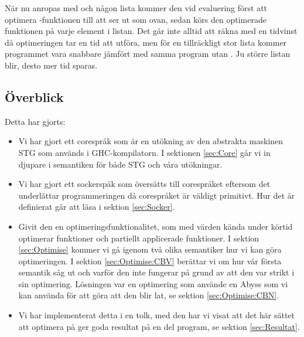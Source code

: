 \documentclass[Rapport]{subfiles}
\begin{document}
När nu  anropas med  och någon lista  kommer
den vid evaluering först att optimera -funktionen till att 
ser ut som  ovan, sedan körs den optimerade funktionen på varje
element i listan. Det går inte alltid att räkna med en tidvinst då optimeringen tar en  tid att utföra,
men för en tillräckligt stor lista 
 kommer programmet vara snabbare jämfört med samma program utan .
Ju större listan  blir, desto mer tid sparas.



\subsection{Överblick}

Detta har gjorts:

\begin{itemize}
    \item Vi har gjort ett corespråk som är en utökning av den abstrakta maskinen STG \cite{stg} som används i 
          GHC-kompilatorn. I sektionen \ref{sec:Core} går vi in djupare i semantiken för både STG och våra utökningar. 
    \item Vi har gjort ett sockerspåk som översätts till corespråket eftersom det underlättar 
          programmeringen då corespråket är väldigt primitivt. Hur det är definierat
          går att läsa i sektion \ref{sec:Socker}.
    \item Givit den en optimeringsfunktionalitet, som med värden kända under körtid
          optimerar funktioner och partiellt applicerade funktioner. I sektion \ref{sec:Optimise}
          kommer vi gå igenom två olika semantiker hur vi kan göra optimeringen.
          I sektion \ref{sec:Optimise:CBV} berättar vi om hur vår första semantik
          såg ut och varför den inte fungerar på grund av att den var strikt i sin
          optimering. Lösningen var en optimering som använde en Abyss som vi kan
          använda för att göra att den blir lat, se sektion \ref{sec:Optimise:CBN}. 
    \item Vi har implementerat detta i en tolk, med den har vi visat att det här sättet 
            att optimera på ger goda resultat på en del program, se sektion \ref{sec:Resultat}.
\end{itemize}

\overviewIntro
{}
\end{document}
